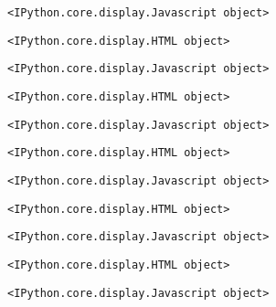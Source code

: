 \documentclass[11pt]{article}
\begin{document}
    
    \begin{verbatim}
<IPython.core.display.Javascript object>
    \end{verbatim}

    
    
    \begin{verbatim}
<IPython.core.display.HTML object>
    \end{verbatim}

    
    
    \begin{verbatim}
<IPython.core.display.Javascript object>
    \end{verbatim}

    
    
    \begin{verbatim}
<IPython.core.display.HTML object>
    \end{verbatim}

    
    
    \begin{verbatim}
<IPython.core.display.Javascript object>
    \end{verbatim}

    
    
    \begin{verbatim}
<IPython.core.display.HTML object>
    \end{verbatim}

    
    
    \begin{verbatim}
<IPython.core.display.Javascript object>
    \end{verbatim}

    
    
    \begin{verbatim}
<IPython.core.display.HTML object>
    \end{verbatim}

    
    
    \begin{verbatim}
<IPython.core.display.Javascript object>
    \end{verbatim}

    
    
    \begin{verbatim}
<IPython.core.display.HTML object>
    \end{verbatim}

    
    
    \begin{verbatim}
<IPython.core.display.Javascript object>
    \end{verbatim}
\end{document}
